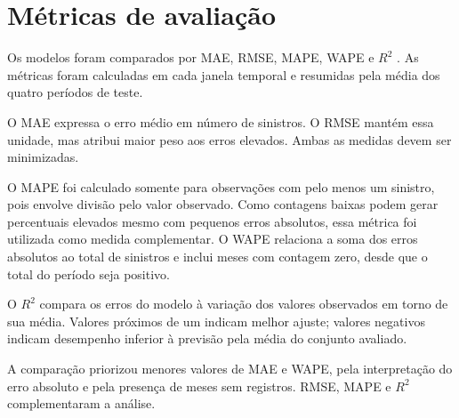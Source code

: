 \documentclass[12pt]{article}
\begin{document}

\section{Métricas de avaliação}
\label{sec:metricas}

Os modelos foram comparados por MAE, RMSE, MAPE, WAPE e $R^2$ \cite{hyndman2006measures}. As métricas foram calculadas em cada janela temporal e resumidas pela média dos quatro períodos de teste.

O MAE expressa o erro médio em número de sinistros. O RMSE mantém essa unidade, mas atribui maior peso aos erros elevados. Ambas as medidas devem ser minimizadas.

O MAPE foi calculado somente para observações com pelo menos um sinistro, pois envolve divisão pelo valor observado. Como contagens baixas podem gerar percentuais elevados mesmo com pequenos erros absolutos, essa métrica foi utilizada como medida complementar. O WAPE relaciona a soma dos erros absolutos ao total de sinistros e inclui meses com contagem zero, desde que o total do período seja positivo.

O $R^2$ compara os erros do modelo à variação dos valores observados em torno de sua média. Valores próximos de um indicam melhor ajuste; valores negativos indicam desempenho inferior à previsão pela média do conjunto avaliado.

A comparação priorizou menores valores de MAE e WAPE, pela interpretação do erro absoluto e pela presença de meses sem registros. RMSE, MAPE e $R^2$ complementaram a análise.



\end{document}
